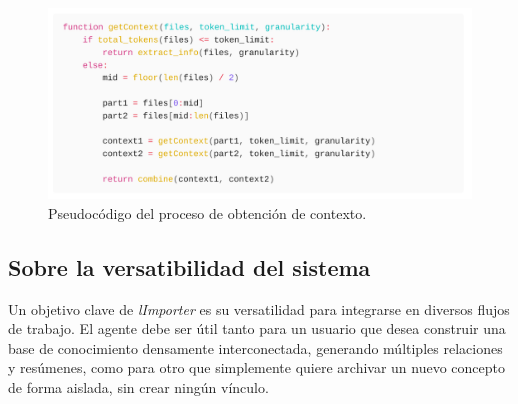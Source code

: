 \begin{figure}[h]
    \centering
    \includegraphics[width=1.0\textwidth]{figures/getContext.pdf}
            
            
    \caption{Pseudocódigo del proceso de obtención de contexto.}
    \label{fig:alg_cprs}
\end{figure}


\subsection{Sobre la versatibilidad del sistema}
Un objetivo clave de \textit{lImporter} es su versatilidad para integrarse en diversos flujos de trabajo. El agente debe ser útil tanto para un usuario que desea construir una base de conocimiento densamente interconectada, generando múltiples relaciones y resúmenes, como para otro que simplemente quiere archivar un nuevo concepto de forma aislada, sin crear ningún vínculo.

